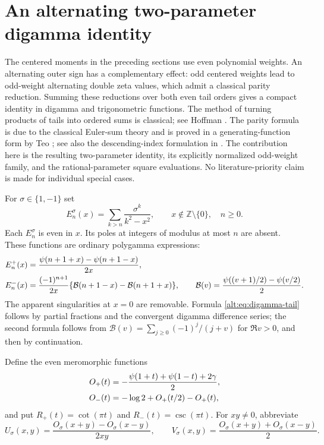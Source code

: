 \section{An alternating two-parameter digamma identity}
\label{alt:sec:master}

The centered moments in the preceding sections use even polynomial weights.
An alternating outer sign has a complementary effect: odd centered weights
lead to odd-weight alternating double zeta values, which admit a classical
parity reduction. Summing these reductions over both even tail orders gives
a compact identity in digamma and trigonometric functions. The method of
turning products of tails into ordered sums is classical; see Hoffman
\cite{Hoffman}. The parity formula is due to the classical Euler-sum
theory and is proved in a generating-function form by Teo
\cite{Teo}; see also the descending-index formulation in
\cite[Eq.~(3.7)]{XuWang}. The contribution here is the resulting
two-parameter identity, its explicitly normalized odd-weight family, and
the rational-parameter square evaluations. No literature-priority claim
is made for individual special cases.

For $\sigma\in\{1,-1\}$ set
\begin{equation}\label{alt:eq:resolvent-tail}
 E_n^\sigma(x)=\sum_{k>n}\frac{\sigma^k}{k^2-x^2},
 \qquad x\notin\mathbb Z\setminus\{0\},\quad n\ge0.
\end{equation}
Each $E_n^\sigma$ is even in $x$. Its poles at integers of modulus at
most $n$ are absent. These functions are ordinary polygamma expressions:
\begin{align}
 E_n^+(x)&=\frac{\psi(n+1+x)-\psi(n+1-x)}{2x},
 \label{alt:eq:digamma-tail}\\
 E_n^-(x)&=\frac{(-1)^{n+1}}{2x}
       \{\mathcal B(n+1-x)-\mathcal B(n+1+x)\},
 \qquad
 \mathcal B(v)=\frac{\psi((v+1)/2)-\psi(v/2)}2.
 \notag
\end{align}
The apparent singularities at $x=0$ are removable. Formula
\eqref{alt:eq:digamma-tail} follows by partial fractions and the
convergent digamma difference series; the second formula follows from
$\mathcal B(v)=\sum_{j\ge0}(-1)^j/(j+v)$ for $\Re v>0$,
and then by continuation.

Define the even meromorphic functions
\begin{align}
 O_+(t)&=-\frac{\psi(1+t)+\psi(1-t)+2\gamma}{2},
 \label{alt:eq:O}\\
 O_-(t)&=-\log2+O_+(t/2)-O_+(t),\notag
\end{align}
and put $R_+(t)=\cot(\pi t)$ and $R_-(t)=\csc(\pi t)$.
For $xy\ne0$, abbreviate
\begin{equation}\label{alt:eq:UV}
 U_\sigma(x,y)=\frac{O_\sigma(x+y)-O_\sigma(x-y)}{2xy},
 \qquad
 V_\sigma(x,y)=\frac{O_\sigma(x+y)+O_\sigma(x-y)}2.
\end{equation}

